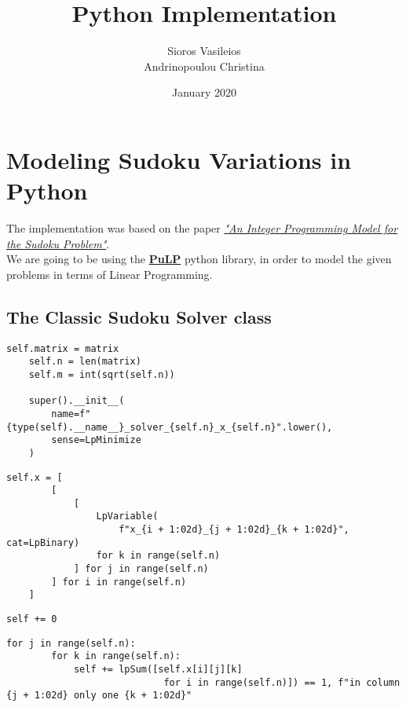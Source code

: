 \documentclass[12pt]{article}
\title{\huge Python Implementation}
\author{Sioros Vasileios\\ Andrinopoulou Christina}
\date{January 2020}
\begin{document}
\maketitle


\pagebreak

\section{Modeling Sudoku Variations in Python}

The implementation was based on the paper \href{https://www.researchgate.net/publication/228615106_An_integer_programming_model_for_the_sudoku_problem}{\textit{"An Integer Programming Model
for the Sudoku Problem"}}. \\

We are going to be using the \href{https://pythonhosted.org/PuLP/}{\textbf{PuLP}} python library,
in order to model the given problems in terms of Linear Programming. \\

\subsection{The Classic Sudoku Solver class}

\begin{lstlisting}[caption={Initializing the \textbf{LpProblem} super class as a minimization problem}]
    self.matrix = matrix
    self.n = len(matrix)
    self.m = int(sqrt(self.n))

    super().__init__(
        name=f"{type(self).__name__}_solver_{self.n}_x_{self.n}".lower(),
        sense=LpMinimize
    )
\end{lstlisting}

\begin{lstlisting}[caption={Declaring our variables}]
    self.x = [
        [
            [
                LpVariable(
                    f"x_{i + 1:02d}_{j + 1:02d}_{k + 1:02d}", cat=LpBinary)
                for k in range(self.n)
            ] for j in range(self.n)
        ] for i in range(self.n)
    ]
\end{lstlisting}

\begin{lstlisting}[caption={Declaring the objective function}]
    self += 0
\end{lstlisting}

\pagebreak

\begin{lstlisting}[caption={Declaring that there should only be one \textit{k} in each column}]
    for j in range(self.n):
        for k in range(self.n):
            self += lpSum([self.x[i][j][k]
                            for i in range(self.n)]) == 1, f"in column {j + 1:02d} only one {k + 1:02d}"
\end{lstlisting}
\end{document}

